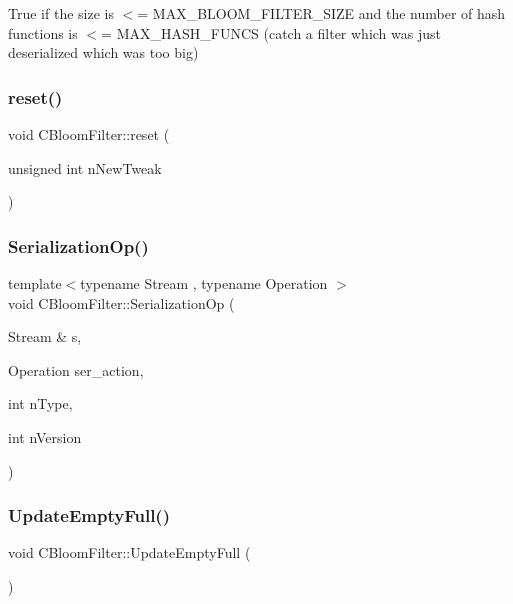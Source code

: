True if the size is $<$= M\+A\+X\+\_\+\+B\+L\+O\+O\+M\+\_\+\+F\+I\+L\+T\+E\+R\+\_\+\+S\+I\+ZE and the number of hash functions is $<$= M\+A\+X\+\_\+\+H\+A\+S\+H\+\_\+\+F\+U\+N\+CS (catch a filter which was just deserialized which was too big) \mbox{\label{class_c_bloom_filter_a2af19739385bad826cfec9f236b65533}} 
\subsubsection{\texorpdfstring{reset()}{reset()}}
{\footnotesize\ttfamily void C\+Bloom\+Filter\+::reset (\begin{DoxyParamCaption}\item[{unsigned int}]{n\+New\+Tweak }\end{DoxyParamCaption})}

\mbox{\label{class_c_bloom_filter_a2d12234d7febc6197a7349d609733cca}} 
\subsubsection{\texorpdfstring{Serialization\+Op()}{SerializationOp()}}
{\footnotesize\ttfamily template$<$typename Stream , typename Operation $>$ \\
void C\+Bloom\+Filter\+::\+Serialization\+Op (\begin{DoxyParamCaption}\item[{Stream \&}]{s,  }\item[{Operation}]{ser\+\_\+action,  }\item[{int}]{n\+Type,  }\item[{int}]{n\+Version }\end{DoxyParamCaption})\hspace{0.3cm}{\ttfamily [inline]}}

\mbox{\label{class_c_bloom_filter_af98b43e91c82a1e4afc7454e8c5672c2}} 
\subsubsection{\texorpdfstring{Update\+Empty\+Full()}{UpdateEmptyFull()}}
{\footnotesize\ttfamily void C\+Bloom\+Filter\+::\+Update\+Empty\+Full (\begin{DoxyParamCaption}{ }\end{DoxyParamCaption})}



